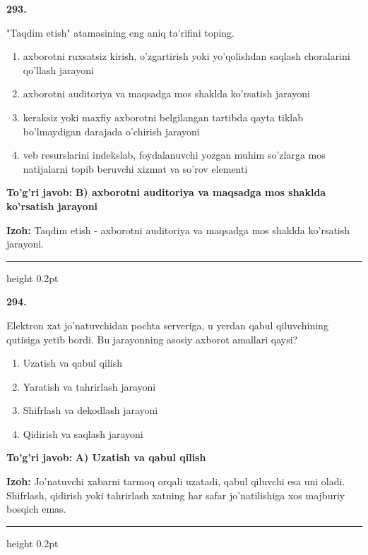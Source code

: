 \documentclass[10pt,a4paper,oneside]{article}
\begin{document}
\noindent\textbf{\color{ink}293.}
\par
"Taqdim etish" atamasining eng aniq ta'rifini toping.
\begin{enumerate}[label=\Alph*),leftmargin=9mm]
\item axborotni ruxsatsiz kirish, o'zgartirish yoki yo'qolishdan saqlash choralarini qo'llash jarayoni
\item axborotni auditoriya va maqsadga mos shaklda ko'rsatish jarayoni
\item keraksiz yoki maxfiy axborotni belgilangan tartibda qayta tiklab bo'lmaydigan darajada o'chirish jarayoni
\item veb resurslarini indekslab, foydalanuvchi yozgan muhim so'zlarga mos natijalarni topib beruvchi xizmat va so'rov elementi
\end{enumerate}
\begin{tcolorbox}[enhanced,breakable,colback=teal!4,colframe=teal!50!black,boxrule=0.5pt,arc=1.1mm,left=3mm,right=3mm,top=1.7mm,bottom=1.7mm,before skip=2mm,after skip=2mm]
\textbf{\color{teal}To'g'ri javob:} \textbf{B) axborotni auditoriya va maqsadga mos shaklda ko'rsatish jarayoni}
\par\smallskip
\textbf{Izoh:} Taqdim etish - axborotni auditoriya va maqsadga mos shaklda ko'rsatish jarayoni.
\end{tcolorbox}
\vspace{2mm}\hrule height 0.2pt \vspace{3mm}

\noindent\textbf{\color{ink}294.}
\par
Elektron xat jo'natuvchidan pochta serveriga, u yerdan qabul qiluvchining qutisiga yetib bordi. Bu jarayonning asosiy axborot amallari qaysi?
\begin{enumerate}[label=\Alph*),leftmargin=9mm]
\item Uzatish va qabul qilish
\item Yaratish va tahrirlash jarayoni
\item Shifrlash va dekodlash jarayoni
\item Qidirish va saqlash jarayoni
\end{enumerate}
\begin{tcolorbox}[enhanced,breakable,colback=teal!4,colframe=teal!50!black,boxrule=0.5pt,arc=1.1mm,left=3mm,right=3mm,top=1.7mm,bottom=1.7mm,before skip=2mm,after skip=2mm]
\textbf{\color{teal}To'g'ri javob:} \textbf{A) Uzatish va qabul qilish}
\par\smallskip
\textbf{Izoh:} Jo'natuvchi xabarni tarmoq orqali uzatadi, qabul qiluvchi esa uni oladi. Shifrlash, qidirish yoki tahrirlash xatning har safar jo'natilishiga xos majburiy bosqich emas.
\end{tcolorbox}
\vspace{2mm}\hrule height 0.2pt \vspace{3mm}
\end{document}
